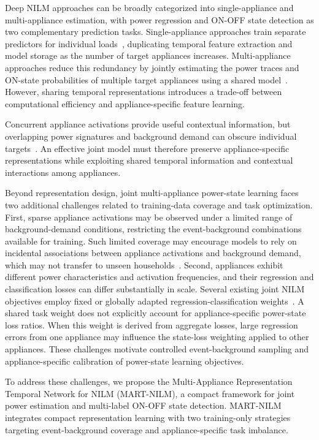 \documentclass[journal]{IEEEtran}
\begin{document}
Deep NILM approaches can be broadly categorized into single-appliance and multi-appliance estimation, with power regression and ON-OFF state detection as two complementary prediction tasks. Single-appliance approaches train separate predictors for individual loads~\cite{wang2022transformer,petralia2025nilmformer}, duplicating temporal feature extraction and model storage as the number of target appliances increases. Multi-appliance approaches reduce this redundancy by jointly estimating the power traces and ON-state probabilities of multiple target appliances using a shared model~\cite{faustine2020unet,alami2023convnilm,virtsionis2023multitarget,dash2024joint,sun2025transfer}. However, sharing temporal representations introduces a trade-off between computational efficiency and appliance-specific feature learning.

Concurrent appliance activations provide useful contextual information, but overlapping power signatures and background demand can obscure individual targets~\cite{liu2026recomposition}. An effective joint model must therefore preserve appliance-specific representations while exploiting shared temporal information and contextual interactions among appliances.

Beyond representation design, joint multi-appliance power-state learning faces two additional challenges related to training-data coverage and task optimization. First, sparse appliance activations may be observed under a limited range of background-demand conditions, restricting the event-background combinations available for training. Such limited coverage may encourage models to rely on incidental associations between appliance activations and background demand, which may not transfer to unseen households~\cite{liu2026recomposition}. Second, appliances exhibit different power characteristics and activation frequencies, and their regression and classification losses can differ substantially in scale. Several existing joint NILM objectives employ fixed or globally adapted regression-classification weights~\cite{sun2025transfer,liu2022samnet}. A shared task weight does not explicitly account for appliance-specific power-state loss ratios. When this weight is derived from aggregate losses, large regression errors from one appliance may influence the state-loss weighting applied to other appliances. These challenges motivate controlled event-background sampling and appliance-specific calibration of power-state learning objectives.

To address these challenges, we propose the Multi-Appliance Representation Temporal Network for NILM (MART-NILM), a compact framework for joint power estimation and multi-label ON-OFF state detection. MART-NILM integrates compact representation learning with two training-only strategies targeting event-background coverage and appliance-specific task imbalance.
\end{document}
